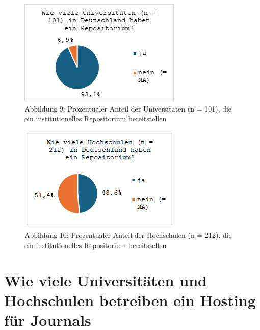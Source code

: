 \documentclass[a4paper,
fontsize=11pt,
oneside,
numbers=noperiodatend,
parskip=half-,
bibliography=totoc,
final
]{scrartcl}
\begin{document}
\begin{figure}[H]
\centering
\includegraphics[]{img/image010.png}
\caption{Abbildung 9: Prozentualer Anteil der Universitäten (n = 101), die ein institutionelles Repositorium bereitstellen}
\end{figure}

\begin{figure}[H]
\centering
\includegraphics[]{img/image009.png}
\caption{Abbildung 10: Prozentualer Anteil der Hochschulen (n = 212), die ein institutionelles Repositorium bereitstellen}
\end{figure}

\section{Wie viele Universitäten und Hochschulen betreiben ein Hosting für Journals}\label{wie-viele-universituxe4ten-und-hochschulen-betreiben-open-access-verlage-undoder-hostingdienste-fuxfcr-zeitschriften}
\end{document}
